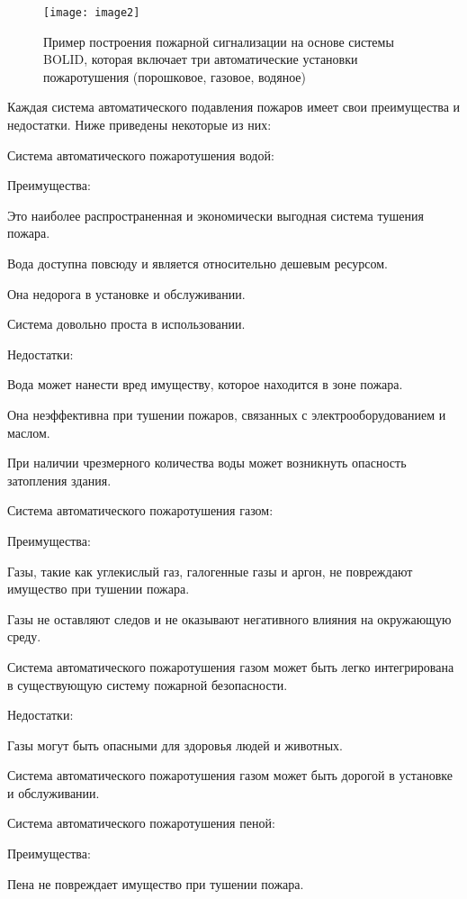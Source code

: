 \begin{figure}[H]
\centering
\texttt{[image: image2]}
\caption{Пример построения пожарной сигнализации на основе системы BOLID,
которая включает три автоматические установки пожаротушения (порошковое,
газовое, водяное)}
\end{figure}

\begin{multicols}{2}

Каждая система автоматического подавления пожаров имеет свои
преимущества и недостатки. Ниже приведены некоторые из них:

Система автоматического пожаротушения водой:

Преимущества:

Это наиболее распространенная и экономически выгодная система тушения
пожара.

Вода доступна повсюду и является относительно дешевым ресурсом.

Она недорога в установке и обслуживании.

Система довольно проста в использовании.

Недостатки:

Вода может нанести вред имуществу, которое находится в зоне пожара.

Она неэффективна при тушении пожаров, связанных с электрооборудованием
и маслом.

При наличии чрезмерного количества воды может возникнуть опасность
затопления здания.

Система автоматического пожаротушения газом:

Преимущества:

Газы, такие как углекислый газ, галогенные газы и аргон, не повреждают
имущество при тушении пожара.

Газы не оставляют следов и не оказывают негативного влияния на
окружающую среду.

Система автоматического пожаротушения газом может быть легко
интегрирована в существующую систему пожарной безопасности.

Недостатки:

Газы могут быть опасными для здоровья людей и животных.

Система автоматического пожаротушения газом может быть дорогой в
установке и обслуживании.

Система автоматического пожаротушения пеной:

Преимущества:

Пена не повреждает имущество при тушении пожара.


\end{multicols}
